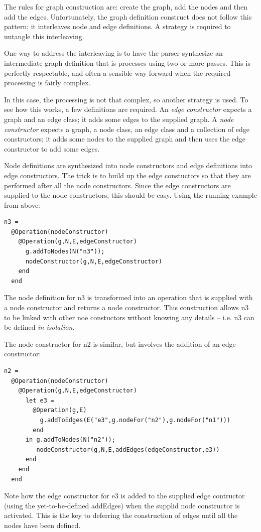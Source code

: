 The rules for graph construction are: create the graph, add the nodes
and then add the edges. Unfortunately, the graph definition construct
does not follow this pattern; it interleaves node and edge definitions.
A strategy is required to untangle this interleaving.

One way to address the interleaving is to have the parser synthesize
an intermediate graph definition that is processes using two or more
passes. This is perfectly respectable, and often a sensible way forward
when the required processing is fairly complex. 

In this case, the processing is not that complex, so another strategy
is used. To see how this works, a few definitions are required. An
\textit{edge constructor} expects a graph and an edge class; it adds
some edges to the supplied graph. A \textit{node constructor} expects
a graph, a node class, an edge class and a collection of edge constructors;
it adds some nodes to the supplied graph and then uses the edge constructor
to add some edges.

Node definitions are synthesized into node constructors and edge definitions
into edge constructors. The trick is to build up the edge constuctors
so that they are performed after all the node constructors. Since
the edge constructors are supplied to the node constructors, this
should be easy. Using the running example from above:

\begin{lstlisting}
n3 =
  @Operation(nodeConstructor)
    @Operation(g,N,E,edgeConstructor)
      g.addToNodes(N("n3"));
      nodeConstructor(g,N,E,edgeConstructor)
    end
  end
\end{lstlisting}The node definition for n3 is transformed into an operation that is
supplied with a node constructor and returns a node constructor. This
construction allows n3 to be linked with other noe constuctors without
knowing any details -- i.e. n3 can be defined \textit{in isolation}. 

The node constructor for n2 is similar, but involves the addition
of an edge constructor:

\begin{lstlisting}
n2 =
  @Operation(nodeConstructor)
    @Operation(g,N,E,edgeConstructor)
      let e3 = 
        @Operation(g,E)
          g.addToEdges(E("e3",g.nodeFor("n2"),g.nodeFor("n1")))
        end
      in g.addToNodes(N("n2"));
         nodeConstructor(g,N,E,addEdges(edgeConstructor,e3))
      end
    end
  end
\end{lstlisting}Note how the edge constructor for e3 is added to the supplied edge
contructor (using the yet-to-be-defined addEdges) when the supplid
node constructor is activated. This is the key to deferring the construction
of edges until all the nodes have been defined.

